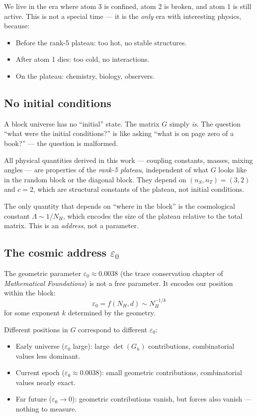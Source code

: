 We live in the era where atom 3 is confined, atom 2 is broken, and atom 1 is still active. This is not a special time --- it is the \emph{only} era with interesting physics, because:
\begin{itemize}
\item Before the rank-5 plateau: too hot, no stable structures.
\item After atom 1 dies: too cold, no interactions.
\item On the plateau: chemistry, biology, observers.
\end{itemize}

\subsection{No initial conditions}

A block universe has no ``initial'' state. The matrix $G$ simply \emph{is}. The question ``what were the initial conditions?'' is like asking ``what is on page zero of a book?'' --- the question is malformed.

All physical quantities derived in this work --- coupling constants, masses, mixing angles --- are properties of the \emph{rank-5 plateau}, independent of what $G$ looks like in the random block or the diagonal block. They depend on $(n_S, n_T) = (3, 2)$ and $c = 2$, which are structural constants of the plateau, not initial conditions.

The only quantity that depends on ``where in the block'' is the cosmological constant $\Lambda \sim 1/N_H$, which encodes the size of the plateau relative to the total matrix. This is an \emph{address}, not a parameter.

\subsection{The cosmic address $\varepsilon_0$}

The geometric parameter $\varepsilon_0 \approx 0.0038$ (the trace conservation chapter of \textit{Mathematical Foundations}) is not a free parameter. It encodes our position within the block:
\begin{equation}
\varepsilon_0 = f(N_H, d) \sim N_H^{-1/k}
\end{equation}
for some exponent $k$ determined by the geometry.

Different positions in $G$ correspond to different $\varepsilon_0$:
\begin{itemize}
\item Early universe ($\varepsilon_0$ large): large $\det(G_h)$ contributions, combinatorial values less dominant.
\item Current epoch ($\varepsilon_0 \approx 0.0038$): small geometric contributions, combinatorial values nearly exact.
\item Far future ($\varepsilon_0 \to 0$): geometric contributions vanish, but forces also vanish --- nothing to measure.
\end{itemize}

